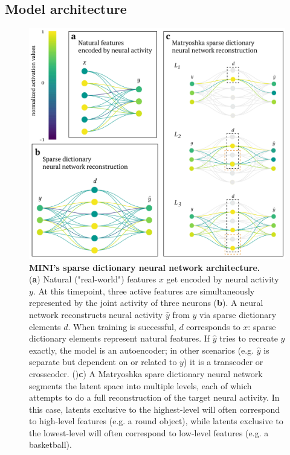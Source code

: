 \subsection{Model architecture}

\begin{figure}[t]
    \begin{minipage}{0.66\linewidth}
    \includegraphics[width=\linewidth]{figures/sdnn_arch.pdf}
    \end{minipage}%
    \begin{minipage}{0.34\linewidth}
    \caption{
        \textbf{MINI's sparse dictionary neural network architecture.} \\
        \small (\textbf{a}) Natural ("real-world") features $x$ get encoded by neural activity $y$. At this timepoint, three active features are simultaneously represented by the joint activity of three neurons (\textbf{b}). A neural network reconstructs neural activity $\hat{y}$ from $y$ via sparse dictionary elements $d$. When training is successful, $d$ corresponds to $x$: sparse dictionary elements represent natural features. If $\hat{y}$ tries to recreate $y$ exactly, the model is an autoencoder; in other scenarios (e.g. $\hat{y}$ is separate but dependent on or related to $y$) it is a transcoder or crosscoder. ()\textbf{c}) A Matryoshka spare dictionary neural network segments the latent space into multiple levels, each of which attempts to do a full reconstruction of the target neural activity. In this case, latents exclusive to the highest-level will often correspond to high-level features (e.g. a round object), while latents exclusive to the lowest-level will often correspond to low-level features (e.g. a basketball).
    }
    \label{fig:sdnn_arch}
    \end{minipage}
\end{figure}

